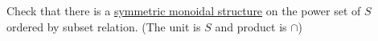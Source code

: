 Check that there is a \hyperref[D2.2]{symmetric monoidal structure} on the power set of $S$ ordered by subset relation. (The unit is $S$ and product is $\cap$)